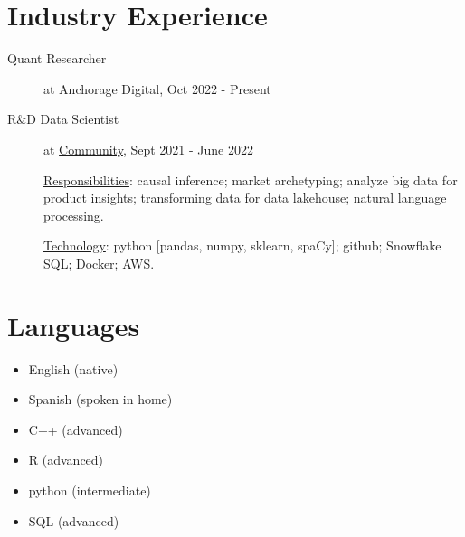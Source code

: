 \documentclass[11pt]{article}
\begin{document}
\section*{Industry Experience}
\begin{minipage}{\textwidth}
	\begin{description}
		\item[Quant Researcher] at Anchorage Digital, Oct 2022 - Present
		\item[R\&D Data Scientist] at \href{https://www.community.com/about-us}{Community}, Sept 2021 - June 2022\\
			\rule{0pt}{12pt}\underline{Responsibilities}: causal inference; market archetyping; analyze big data for product insights; transforming data for data lakehouse; natural language processing.\\
			\rule{0pt}{12pt}\underline{Technology}: python [pandas, numpy, sklearn, spaCy]; github; Snowflake SQL; Docker; AWS.
	\end{description}
\end{minipage}

\section*{Languages}
\begin{minipage}{\columnwidth}
\begin{multicols}{3}
	\begin{itemize}
		\item English (native)
		\item Spanish (spoken in home)
		\item C++ (advanced) %
		\item R (advanced) %
		\item python (intermediate) %
		\item SQL (advanced) 
	\end{itemize}
\end{multicols}
\end{minipage}
\end{document}
